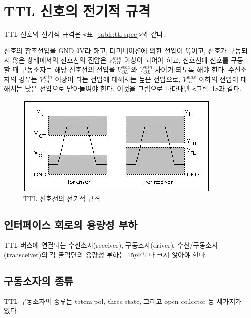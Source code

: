 \section{TTL 신호의 전기적 규격}
TTL 신호의 전기적 규격은 {\tt <}표~\ref{table:ttl-spec}{\tt >}와 같다.
%

%
신호의 참조전압을 GND 0V라 하고, 터미네이션에 의한 전압이 $V_t$이고,
신호가 구동되지 않은 상태에서의 신호선의 전압은 $V_{OH}^{min}$ 이상이 되어야 하고,
신호선에 신호를 구동할 때 구동소자는 해당 신호선의 전압을 $V_{OL}^{max}$와
$V_{OL}^{min}$ 사이가 되도록 해야 한다.
수신소자의 경우는 $V_{IH}^{min}$ 이상이 되는 전압에 대해서는 높은 전압으로,
$V_{IL}^{max}$ 이하의 전압에 대해서는 낮은 전압으로 받아들여야 한다.
이것을 그림으로 나타내면 {\tt <}그림~\ref{figure:signal-spec-ttl}{\tt >}과 같다.
%
\begin{figure}[htb]
    \centerline{\includegraphics{ch7/FIG/signal-spec.jpg}}
   \caption{TTL 신호선의 전기적 규격}\label{figure:signal-spec-ttl}
\end{figure}
%

\subsection{인터페이스 회로의 용량성 부하}
%
TTL 버스에 연결되는 수신소자(receiver), 구동소자(driver), 수신/구동소자(transceiver)의
각 출력단의 용량성 부하는 15$p$F보다 크지 않아야 한다.

\subsection{구동소자의 종류}
TTL 구동소자의 종류는 totem-pol, three-state, 그리고 open-collector 등
세가지가 있다.
%
%
